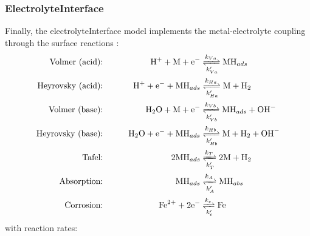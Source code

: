 \documentclass[3p]{elsarticle} %
\begin{document}
\subsubsection{ElectrolyteInterface}
Finally, the electrolyteInterface model implements the metal-electrolyte coupling through the surface reactions \citep{Liu2014, Hageman2022}:
\begin{alignat}{2}
 \text{Volmer (acid):} && \mathrm{H}^+ + \mathrm{M} + \mathrm{e}^- &\xrightleftharpoons[k_{Va}']{k_{Va}} \mathrm{MH}_{ads} \label{react:1} \\
  \text{Heyrovsky (acid):} && \qquad \mathrm{H}^+ + \mathrm{e}^- + \mathrm{MH}_{ads}&\xrightleftharpoons[k_{Ha}']{k_{Ha}} \mathrm{M} + \mathrm{H}_2 \label{react:2} \\
    \text{Volmer (base):} &&  \mathrm{H}_2\mathrm{O} + \mathrm{M} + \mathrm{e}^- &\xrightleftharpoons[k_{Vb}']{k_{Vb}} \mathrm{MH}_{ads} + \mathrm{OH}^- \label{react:5} \\
   \text{Heyrovsky (base):} && \qquad  \mathrm{H}_2\mathrm{O} + \mathrm{e}^- + \mathrm{MH}_{ads}&\xrightleftharpoons[k_{Hb}']{k_{Hb}} \mathrm{M} + \mathrm{H}_2 + \mathrm{OH}^- \label{react:6} \\
    \text{Tafel:} && 2 \mathrm{MH}_{ads} &\xrightleftharpoons[k_T']{k_T} 2\mathrm{M} + \mathrm{H}_2 \label{react:3} \\
   \text{Absorption:} && \mathrm{MH}_{ads} &\xrightleftharpoons[k_A']{k_A} \mathrm{MH}_{abs}  \label{react:4} \\
   \text{Corrosion:} && \qquad  \mathrm{Fe}^{2+}+2\mathrm{e}^- &\xrightleftharpoons[k_c']{k_c} \mathrm{Fe} \label{react:7}
\end{alignat}
with reaction rates:
\end{document}
